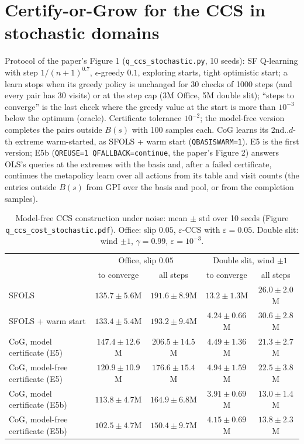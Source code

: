 \documentclass[11pt]{article}
\begin{document}
\section{Certify-or-Grow for the CCS in stochastic domains}\label{sec:ccs}

Protocol of the paper's Figure 1 (\texttt{q\_ccs\_stochastic.py}, 10 seeds): SF Q-learning with step $1/(n+1)^{0.7}$,
$\epsilon$-greedy $0.1$, exploring starts, tight optimistic start; a learn stops when its greedy policy is unchanged
for 30 checks of 1000 steps (and every pair has 30 visits) or at the step cap (3M Office, 5M double slit); ``steps to
converge'' is the last check where the greedy value at the start is more than $10^{-3}$ below the optimum (oracle).
Certificate tolerance $10^{-2}$; the model-free version completes the pairs outside $B(s)$ with 100 samples each. CoG
learns its 2nd..$d$-th extreme warm-started, as SFOLS + warm start (\texttt{QBASISWARM=1}). E5 is the first version;
E5b (\texttt{QREUSE=1 QFALLBACK=continue}, the paper's Figure 2) answers OLS's queries at the extremes with the basis
and, after a failed certificate, continues the metapolicy learn over all actions from its table and visit counts (the
entries outside $B(s)$ from GPI over the basis and pool, or from the completion samples).

\begin{table}[h]\centering\small
\caption{Model-free CCS construction under noise: mean $\pm$ std over 10 seeds (Figure
\texttt{q\_ccs\_cost\_stochastic.pdf}). Office: slip $0.05$, $\varepsilon$-CCS with $\varepsilon=0.05$. Double slit:
wind $\pm1$, $\gamma=0.99$, $\varepsilon=10^{-3}$.}\label{tab:ccs}
\begin{tabular}{lcccc}
\toprule
& \multicolumn{2}{c}{Office, slip $0.05$} & \multicolumn{2}{c}{Double slit, wind $\pm1$}\\
& to converge & all steps & to converge & all steps\\
\midrule
SFOLS & $135.7\pm5.6$M & $191.6\pm8.9$M & $13.2\pm1.3$M & $26.0\pm2.0$M\\
SFOLS + warm start & $133.4\pm5.4$M & $193.2\pm9.4$M & $4.24\pm0.66$M & $30.6\pm2.8$M\\
CoG, model certificate (E5) & $147.4\pm12.6$M & $206.5\pm14.5$M & $4.49\pm1.36$M & $21.3\pm2.7$M\\
CoG, model-free certificate (E5) & $120.9\pm10.9$M & $176.6\pm15.4$M & $4.94\pm1.59$M & $22.5\pm3.8$M\\
CoG, model certificate (E5b) & $\mathbf{113.8\pm4.7}$M & $164.9\pm6.8$M & $\mathbf{3.91\pm0.69}$M & $\mathbf{13.0\pm1.4}$M\\
CoG, model-free certificate (E5b) & $\mathbf{102.5\pm4.7}$M & $\mathbf{150.4\pm9.7}$M & $4.15\pm0.69$M & $13.8\pm2.3$M\\
\bottomrule
\end{tabular}
\end{table}
\end{document}
